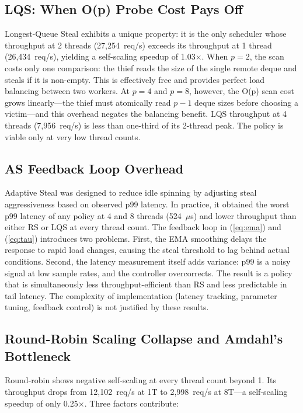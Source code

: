 \documentclass[conference]{IEEEtran}
\begin{document}
\subsection{LQS: When O(p) Probe Cost Pays Off}

Longest-Queue Steal exhibits a unique property: it is the only scheduler whose throughput at 2 threads (27,254~req/s) exceeds its throughput at 1 thread (26,434~req/s), yielding a self-scaling speedup of 1.03$\times$. When $p=2$, the scan costs only one comparison: the thief reads the size of the single remote deque and steals if it is non-empty. This is effectively free and provides perfect load balancing between two workers. At $p=4$ and $p=8$, however, the O(p) scan cost grows linearly---the thief must atomically read $p-1$ deque sizes before choosing a victim---and this overhead negates the balancing benefit. LQS throughput at 4 threads (7,956~req/s) is less than one-third of its 2-thread peak. The policy is viable only at very low thread counts.

\subsection{AS Feedback Loop Overhead}

Adaptive Steal was designed to reduce idle spinning by adjusting steal aggressiveness based on observed p99 latency. In practice, it obtained the worst p99 latency of any policy at 4 and 8 threads (524~$\mu$s) and lower throughput than either RS or LQS at every thread count. The feedback loop in (\ref{eq:ema}) and (\ref{eq:tau}) introduces two problems. First, the EMA smoothing delays the response to rapid load changes, causing the steal threshold to lag behind actual conditions. Second, the latency measurement itself adds variance: p99 is a noisy signal at low sample rates, and the controller overcorrects. The result is a policy that is simultaneously less throughput-efficient than RS and less predictable in tail latency. The complexity of implementation (latency tracking, parameter tuning, feedback control) is not justified by these results.

\subsection{Round-Robin Scaling Collapse and Amdahl's Bottleneck}

Round-robin shows negative self-scaling at every thread count beyond 1. Its throughput drops from 12,102~req/s at 1T to 2,998~req/s at 8T---a self-scaling speedup of only 0.25$\times$. Three factors contribute:
\end{document}
